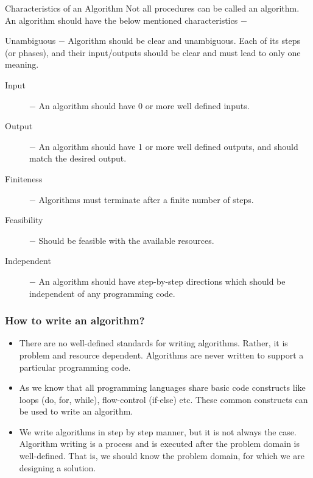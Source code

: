 \documentclass{beamer}
\begin{document}
\begin{frame}
Characteristics of an Algorithm
Not all procedures can be called an algorithm. An algorithm should have the below mentioned characteristics −

Unambiguous − Algorithm should be clear and unambiguous. Each of its steps (or phases), and their input/outputs should be clear and must lead to only one meaning.

\begin{description}
\item[Input] − An algorithm should have 0 or more well defined inputs.

\item[Output] − An algorithm should have 1 or more well defined outputs, and should match the desired output.

\item[Finiteness] − Algorithms must terminate after a finite number of steps.

\item[Feasibility] − Should be feasible with the available resources.

\item[Independent] − An algorithm should have step-by-step directions which should be independent of any programming code.
\end{description}
\end{frame}
\begin{frame}
\frametitle{How to write an algorithm?}
\begin{itemize}
	\item There are no well-defined standards for writing algorithms. Rather, it is problem and resource dependent. Algorithms are never written to support a particular programming code.
	
\item As we know that all programming languages share basic code constructs like loops (do, for, while), flow-control (if-else) etc. These common constructs can be used to write an algorithm.
	
\item We write algorithms in step by step manner, but it is not always the case. Algorithm writing is a process and is executed after the problem domain is well-defined. That is, we should know the problem domain, for which we are designing a solution.
\end{itemize}

\end{frame}
\end{document}
